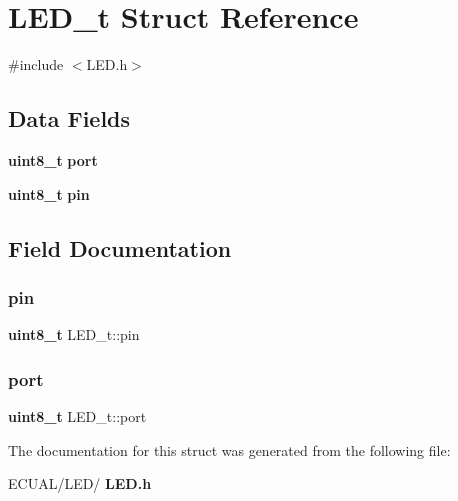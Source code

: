\section{L\+E\+D\+\_\+t Struct Reference}
\label{struct_l_e_d__t}


{\ttfamily \#include $<$L\+E\+D.\+h$>$}

\subsection*{Data Fields}
\begin{DoxyCompactItemize}
\item 
\textbf{ uint8\+\_\+t} \textbf{ port}
\item 
\textbf{ uint8\+\_\+t} \textbf{ pin}
\end{DoxyCompactItemize}


\subsection{Field Documentation}
\mbox{\label{struct_l_e_d__t_a67419744c216cc88b5bdf12cccb50e2b}} 
\subsubsection{pin}
{\footnotesize\ttfamily \textbf{ uint8\+\_\+t} L\+E\+D\+\_\+t\+::pin}

\mbox{\label{struct_l_e_d__t_a4cd3fe209df3d40bd2994a6cfc0e26a2}} 
\subsubsection{port}
{\footnotesize\ttfamily \textbf{ uint8\+\_\+t} L\+E\+D\+\_\+t\+::port}



The documentation for this struct was generated from the following file\+:\begin{DoxyCompactItemize}
\item 
E\+C\+U\+A\+L/\+L\+E\+D/\textbf{ L\+E\+D.\+h}\end{DoxyCompactItemize}
